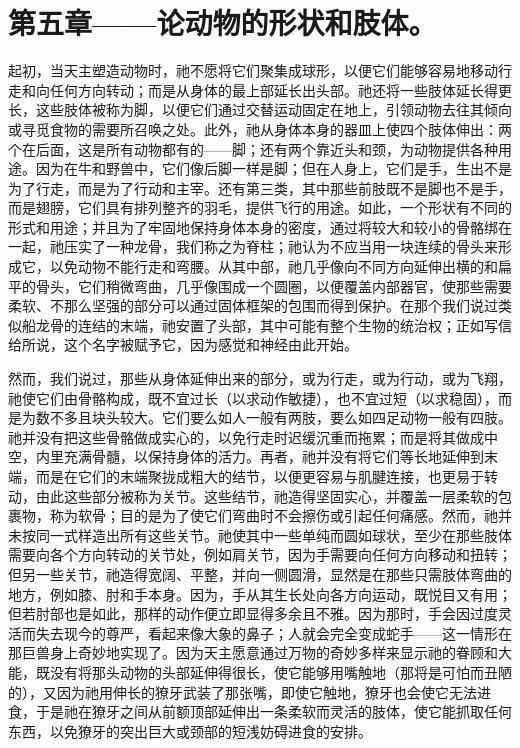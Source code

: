 
\section{第五章——论动物的形状和肢体。}

起初，当天主塑造动物时，祂不愿将它们聚集成球形，以便它们能够容易地移动行走和向任何方向转动；而是从身体的最上部延长出头部。祂还将一些肢体延长得更长，这些肢体被称为脚，以便它们通过交替运动固定在地上，引领动物去往其倾向或寻觅食物的需要所召唤之处。此外，祂从身体本身的器皿上使四个肢体伸出：两个在后面，这是所有动物都有的——脚；还有两个靠近头和颈，为动物提供各种用途。因为在牛和野兽中，它们像后脚一样是脚；但在人身上，它们是手，生出不是为了行走，而是为了行动和主宰。还有第三类，其中那些前肢既不是脚也不是手，而是翅膀，它们具有排列整齐的羽毛，提供飞行的用途。如此，一个形状有不同的形式和用途；并且为了牢固地保持身体本身的密度，通过将较大和较小的骨骼绑在一起，祂压实了一种龙骨，我们称之为脊柱；祂认为不应当用一块连续的骨头来形成它，以免动物不能行走和弯腰。从其中部，祂几乎像向不同方向延伸出横的和扁平的骨头，它们稍微弯曲，几乎像围成一个圆圈，以便覆盖内部器官，使那些需要柔软、不那么坚强的部分可以通过固体框架的包围而得到保护。在那个我们说过类似船龙骨的连结的末端，祂安置了头部，其中可能有整个生物的统治权；正如写信给所说，这个名字被赋予它，因为感觉和神经由此开始。\par

然而，我们说过，那些从身体延伸出来的部分，或为行走，或为行动，或为飞翔，祂使它们由骨骼构成，既不宜过长（以求动作敏捷），也不宜过短（以求稳固），而是为数不多且块头较大。它们要么如人一般有两肢，要么如四足动物一般有四肢。祂并没有把这些骨骼做成实心的，以免行走时迟缓沉重而拖累；而是将其做成中空，内里充满骨髓，以保持身体的活力。再者，祂并没有将它们等长地延伸到末端，而是在它们的末端聚拢成粗大的结节，以便更容易与肌腱连接，也更易于转动，由此这些部分被称为关节。这些结节，祂造得坚固实心，并覆盖一层柔软的包裹物，称为软骨；目的是为了使它们弯曲时不会擦伤或引起任何痛感。然而，祂并未按同一式样造出所有这些关节。祂使其中一些单纯而圆如球状，至少在那些肢体需要向各个方向转动的关节处，例如肩关节，因为手需要向任何方向移动和扭转；但另一些关节，祂造得宽阔、平整，并向一侧圆滑，显然是在那些只需肢体弯曲的地方，例如膝、肘和手本身。因为，手从其生长处向各方向运动，既悦目又有用；但若肘部也是如此，那样的动作便立即显得多余且不雅。因为那时，手会因过度灵活而失去现今的尊严，看起来像大象的鼻子；人就会完全变成蛇手——这一情形在那巨兽身上奇妙地实现了。因为天主愿意通过万物的奇妙多样来显示祂的眷顾和大能，既没有将那头动物的头部延伸得很长，使它能够用嘴触地（那将是可怕而丑陋的），又因为祂用伸长的獠牙武装了那张嘴，即使它触地，獠牙也会使它无法进食，于是祂在獠牙之间从前额顶部延伸出一条柔软而灵活的肢体，使它能抓取任何东西，以免獠牙的突出巨大或颈部的短浅妨碍进食的安排。\par

